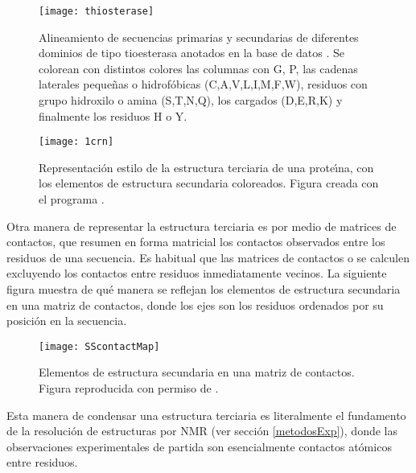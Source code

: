 \begin{figure}
\begin{center} 
\texttt{[image: thiosterase]}
\caption%
{
Alineamiento de secuencias primarias y secundarias de diferentes dominios de tipo tioesterasa
anotados en la base de datos .
Se colorean con distintos colores las columnas con G, P, las cadenas laterales peque\~{n}as o hidrof\'{o}bicas 
(C,A,V,L,I,M,F,W), residuos con grupo hidroxilo o amina (S,T,N,Q), los cargados (D,E,R,K)
y finalmente los residuos H o Y.
}
\label{fig:1bvq}
\end{center}
\end{figure}


\begin{figure}
\begin{center} 
\texttt{[image: 1crn]}
\caption%
{
Representaci\'{o}n estilo  de la 
estructura terciaria de una prote\'\i{}na, con los elementos de estructura secundaria coloreados. 
Figura creada con el programa .
}
\label{fig:1crn}
\end{center}
\end{figure}

Otra manera de representar la estructura terciaria es por medio de matrices de contactos, 
que resumen en forma matricial los contactos observados entre los residuos de una secuencia. 
Es habitual que las matrices de contactos o 
se calculen excluyendo los contactos entre residuos inmediatamente vecinos.
La siguiente figura muestra de qu\'{e} manera se reflejan los elementos de estructura
secundaria en una matriz de contactos, donde los ejes son los residuos ordenados por su posici\'{o}n en la secuencia.

\begin{figure}
\begin{center} 
\texttt{[image: SScontactMap]}
\caption%
{
Elementos de estructura secundaria en una matriz de contactos.
Figura reproducida con permiso de 
.
}
\label{fig:SScontacts}
\end{center}
\end{figure}

Esta manera de condensar una estructura terciaria es literalmente el fundamento de la resoluci\'{o}n de estructuras por NMR 
(ver secci\'{o}n \ref{metodosExp}), donde las observaciones experimentales de partida son esencialmente contactos at\'{o}micos 
entre residuos. 

